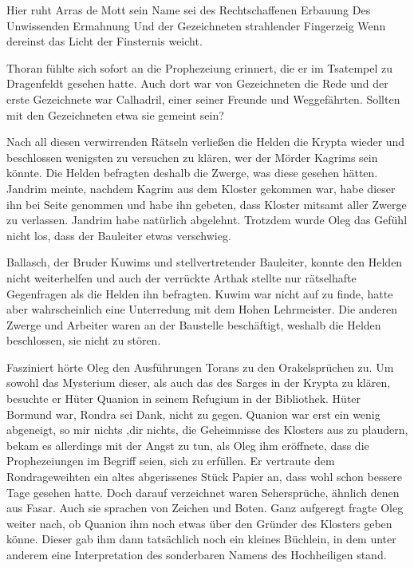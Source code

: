 \documentclass[11pt]{scrreprt}
\begin{document}
Hier ruht Arras de Mott\newline
sein Name sei des Rechtschaffenen Erbauung\newline
Des Unwissenden Ermahnung\newline
Und der Gezeichneten strahlender Fingerzeig\newline
Wenn dereinst\newline
das Licht der Finsternis weicht.\par
Thoran fühlte sich sofort an die Prophezeiung erinnert, die er im Tsatempel zu Dragenfeldt gesehen hatte. Auch dort war von Gezeichneten die Rede und der erste Gezeichnete war Calhadril, einer seiner Freunde und Weggefährten. Sollten mit den Gezeichneten etwa sie gemeint sein?\par
Nach all diesen verwirrenden Rätseln verließen die Helden die Krypta wieder und beschlossen wenigsten zu versuchen zu klären, wer der Mörder Kagrims sein könnte. Die Helden befragten deshalb die Zwerge, was diese gesehen hätten. Jandrim meinte, nachdem Kagrim aus dem Kloster gekommen war, habe dieser ihn bei Seite genommen und habe ihn gebeten, dass Kloster mitsamt aller Zwerge zu verlassen. Jandrim habe natürlich abgelehnt. Trotzdem wurde Oleg das Gefühl nicht los, dass der Bauleiter etwas verschwieg.\par
Ballasch, der Bruder Kuwims und stellvertretender Bauleiter, konnte den Helden nicht weiterhelfen und auch der verrückte Arthak stellte nur rätselhafte Gegenfragen als die Helden ihn befragten. Kuwim war nicht auf zu finde, hatte aber wahrscheinlich eine Unterredung mit dem Hohen Lehrmeister. Die anderen Zwerge und Arbeiter waren an der Baustelle beschäftigt, weshalb die Helden beschlossen, sie nicht zu stören.\par
Fasziniert hörte Oleg den Ausführungen Torans zu den Orakelsprüchen zu. Um sowohl das Mysterium dieser, als auch das des Sarges in der Krypta zu klären, besuchte er Hüter Quanion in seinem Refugium in der Bibliothek. Hüter Bormund war, Rondra sei Dank, nicht zu gegen. Quanion war erst ein wenig abgeneigt, so mir nichts ,dir nichts, die Geheimnisse des Klosters aus zu plaudern, bekam es allerdings mit der Angst zu tun, als Oleg ihm eröffnete, dass die Prophezeiungen im Begriff seien, sich zu erfüllen. Er vertraute dem Rondrageweihten ein altes abgerissenes Stück Papier an, dass wohl schon bessere Tage gesehen hatte. Doch darauf verzeichnet waren Sehersprüche, ähnlich denen aus Fasar. Auch sie sprachen von Zeichen und Boten. Ganz aufgeregt fragte Oleg weiter nach, ob Quanion ihm noch etwas über den Gründer des Klosters geben könne. Dieser gab ihm dann tatsächlich noch ein kleines Büchlein, in dem unter anderem eine Interpretation des sonderbaren Namens des Hochheiligen stand. \par
\end{document}
